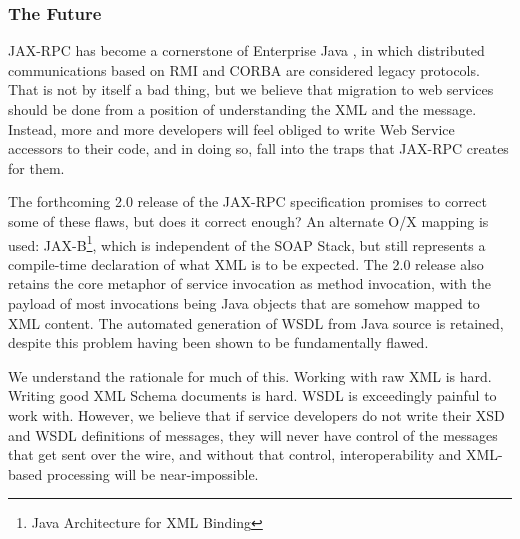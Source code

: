 
\subsubsection{The Future}
\label{objections:implications:future}

JAX-RPC has become a cornerstone of Enterprise Java \cite{spec:J2EE-14}, in
which distributed communications based on RMI and CORBA are considered
legacy protocols. That is not by itself a bad thing, but we believe
that migration to web services should be done from a position of
understanding the XML and the message. Instead, more and more
developers will feel obliged to write Web Service accessors to their
code, and in doing so, fall into the traps that JAX-RPC creates for
them.

The forthcoming 2.0 release of the JAX-RPC specification promises to
correct some of these flaws, but does it correct enough? An alternate
O/X mapping is used: JAX-B\footnote{Java Architecture for XML
Binding}, which is independent of the SOAP Stack, but still represents
a compile-time declaration of what XML is to be expected. The 2.0
release also retains the core metaphor of service invocation as method
invocation, with the payload of most invocations being Java objects
that are somehow mapped to XML content. The automated generation of
WSDL from Java source is retained, despite this problem having been
shown to be fundamentally flawed.

We understand the rationale for much of this. Working with raw XML is
hard.  Writing good XML Schema documents is hard. WSDL is exceedingly
painful to work with. However, we believe that if service developers do not write
their XSD and WSDL definitions of messages, they will never have
control of the messages that get sent over the wire, and without that
control, interoperability and XML-based processing will be near-impossible.

